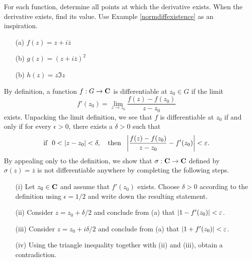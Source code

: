 \vspace{0.1in}

\begin{problem}\label{prob 6.9}
For each function, determine all points at which the derivative exists. When the derivative exists, find its value. Use Example \ref{normdiffexistence} as an inspiration.
\begin{itemize}
\item[(a)] $f(z) = z + i\overline{z}$
\item[(b)] $g(z) = (z + i\overline{z})^2$
\item[(b)] $h(z) = z\Im z$
\end{itemize}
\end{problem}

\vspace{0.1in}

\begin{problem}\label{prob 6.10}
By definition, a function $f : G \to \mathbf C$ is differentiable at $z_0 \in G$ if the limit
\[f'(z_0) = \lim_{z\to z_0}\frac{f(z) - f(z_0)}{z - z_0}\]
exists. Unpacking the limit definition, we see that $f$ is differentiable at $z_0$ if and only if for every $\epsilon > 0$, there exists a $\delta > 0$ such that
\[\text{if }\ 0 < \left\lvert z - z_0\right\rvert < \delta,\quad \text{then }\ \left\lvert\frac{f(z) - f(z_0)}{z - z_0} - f'(z_0)\right\rvert < \varepsilon.\]
\newpage
By appealing only to the definition, we show that $\sigma : \mathbf C \to \mathbf C$ defined by $\sigma(z) = \overline{z}$ is not differentiable anywhere by completing the following steps.
\begin{itemize}
\item[(i)] Let $z_0 \in \mathbf C$ and assume that $f'(z_0)$ exists. Choose $\delta > 0$ according to the definition using $\epsilon = 1/2$ and write down the resulting statement.
\item[(ii)] Consider $z = z_0 + \delta/2$ and conclude from (a) that $\left\lvert1 - f'(z_0)\right\rvert < \varepsilon$.
\item[(iii)] Consider $z = z_0 + i\delta/2$ and conclude from (a) that $\left\lvert1 + f'(z_0)\right\rvert < \varepsilon$.
\item[(iv)] Using the triangle inequality together with (ii) and (iii), obtain a contradiction.
\end{itemize}
\end{problem}
